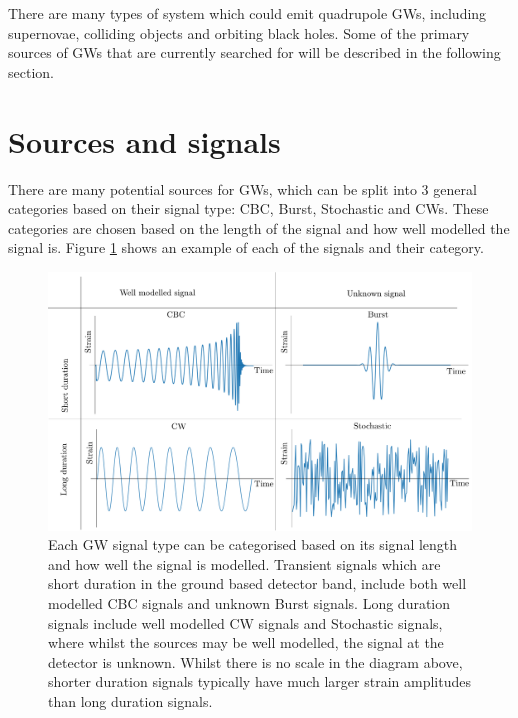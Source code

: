 There are many types of system which could emit quadrupole \glspl{GW}, including supernovae, colliding objects and orbiting black holes. 
Some of the primary sources of \glspl{GW} that are currently searched for will be described in the following section.




\section{\label{intro:sources}Sources and signals}

There are many potential sources for \glspl{GW}, which can be split into 3
general categories based on their signal type: \gls{CBC}, Burst, Stochastic and
\glspl{CW}.  These categories are chosen based on the length of the signal and
how well modelled the signal is.  Figure \ref{intro:sources:signaltypes} shows
an example of each of the signals and their category.
%
\begin{figure}[h]
    \centering
    \includegraphics[width=\textwidth]{C1_intro/sources_types.pdf}
    \caption[GW signal types]{Each \gls{GW} signal type can be categorised
based on its signal length and how well the signal is modelled. Transient
signals which are short duration in the ground based detector band, include
both well modelled \gls{CBC} signals and unknown Burst signals. Long duration
signals include well modelled \gls{CW} signals and Stochastic
signals, where whilst the sources may be well modelled, the signal at the detector is unknown.
Whilst there is no scale in the diagram above, shorter duration signals typically have much larger strain amplitudes than long duration signals.}
\label{intro:sources:signaltypes}
\end{figure}

